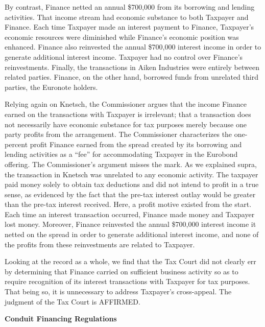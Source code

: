 \begin{select}
By contrast, Finance netted an annual \$700,000 from its borrowing and lending activities. That income stream had economic substance to both Taxpayer and Finance. Each time Taxpayer made an interest payment to Finance, Taxpayer's economic resources were diminished while Finance's economic position was enhanced. Finance also reinvested the annual \$700,000 interest income in order to generate additional interest income. Taxpayer had no control over Finance's reinvestments. Finally, the transactions in Aiken Industries were entirely between related parties. Finance, on the other hand, borrowed funds from unrelated third parties, the Euronote holders.

Relying again on Knetsch, the Commissioner argues that the income Finance earned on the transactions with Taxpayer is irrelevant; that a transaction does not necessarily have economic substance for tax purposes merely because one party profits from the arrangement. The Commissioner characterizes the one-percent profit Finance earned from the spread created by its borrowing and lending activities as a ``fee'' for accommodating Taxpayer in the Eurobond offering. The Commissioner's argument misses the mark. As we explained supra, the transaction in Knetsch was unrelated to any economic activity. The taxpayer paid money solely to obtain tax deductions and did not intend to profit in a true sense, as evidenced by the fact that the pre-tax interest outlay would be greater than the pre-tax interest received. Here, a profit motive existed from the start. Each time an interest transaction occurred, Finance made money and Taxpayer lost money. Moreover, Finance reinvested the annual \$700,000 interest income it netted on the spread in order to generate additional interest income, and none of the profits from these reinvestments are related to Taxpayer.

Looking at the record as a whole, we find that the Tax Court did not clearly err by determining that Finance carried on sufficient business activity so as to require recognition of its interest transactions with Taxpayer for tax purposes. That being so, it is unnecessary to address Taxpayer's cross-appeal. The judgment of the Tax Court is AFFIRMED.

\end{select}

	\begin{center}
		\textbf{Conduit Financing Regulations}
	\end{center}

